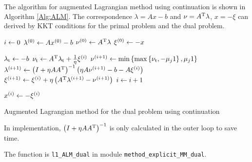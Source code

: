 \documentclass[english]{pkupaper}
\begin{document}
\begin{thmquestion}[3 (g)]
The algorithm for augmented Lagrangian method using continuation is shown in Algorithm \ref{Alg:ALM}. The correspondence $ \lambda = A x - b $ and $ \nu = A^{\mathrm{T}} \lambda $, $ x = - \xi $ can derived by KKT conditions for the primal problem and the dual problem.

\begin{algorithm}
\SetAlgoLined


$ i \leftarrow 0 $\;
$ \lambda^{\left( 0 \right)} \leftarrow A x^{\left( 0 \right)} - b $\;
$ \nu^{\left( 0 \right)} \leftarrow A^{\mathrm{T}} \lambda $\;
$ \xi^{\left( 0 \right)} \leftarrow -x $\;

{
	{
		$ \lambda_{\mathrm{t}} \leftarrow -b $\;
		$ \nu_{\mathrm{t}} \leftarrow A^{\mathrm{T}} \lambda_{\mathrm{t}} + \frac{1}{\eta} \xi^{\left( i \right)} $\;
		$ \nu^{\left(  i + 1  \right)} \leftarrow \min \left\{  \max \left\{  \nu_{\mathrm{t}}, -\mu_j 1  \right\}, \mu_j 1  \right\} $\;
		$ \lambda^{\left(  i + 1  \right)} \leftarrow \left(  I + \eta A A^{\mathrm{T}}  \right)^{-1} \left(  \eta A \nu^{\left(  i + 1  \right)} - b - A \xi^{\left( i \right)}  \right) $\;
		$ \xi^{\left(  i + 1  \right)} \leftarrow \xi^{\left( i \right)} + \eta \left(  A^{\mathrm{T}} \lambda^{\left(  i + 1  \right)} - \nu^{\left(  i + 1  \right)}  \right) $\;
		$ i \leftarrow i + 1 $\;
	}
}

$ x^{\left( i \right)} \leftarrow -\xi^{\left( i \right)} $\;

\caption{Augmented Lagrangian method for the dual problem using continuation} \label{Alg:ALM}
\end{algorithm}

In implementation, $ \left(  I + \eta A A^{\mathrm{T}}  \right)^{-1} $ is only calculated in the outer loop to save time.

The function is \verb"l1_ALM_dual" in module \verb"method_explicit_MM_dual".
\end{thmquestion}
\end{document}
